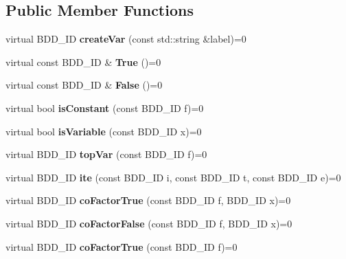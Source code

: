\subsection*{Public Member Functions}
\begin{DoxyCompactItemize}
\item 
virtual B\+D\+D\+\_\+\+ID {\bfseries create\+Var} (const std\+::string \&label)=0\label{classClassProject_1_1ManagerInterface_ab101acd3fbe6a5e29973d88f9862b8b4}

\item 
virtual const B\+D\+D\+\_\+\+ID \& {\bfseries True} ()=0\label{classClassProject_1_1ManagerInterface_a104d0e8bcbd81eb501b66db6e24d1f63}

\item 
virtual const B\+D\+D\+\_\+\+ID \& {\bfseries False} ()=0\label{classClassProject_1_1ManagerInterface_a98d18e1bc840fd664af015facfdcf690}

\item 
virtual bool {\bfseries is\+Constant} (const B\+D\+D\+\_\+\+ID f)=0\label{classClassProject_1_1ManagerInterface_a0edd879f6ecae7bc5f84a2d55373d977}

\item 
virtual bool {\bfseries is\+Variable} (const B\+D\+D\+\_\+\+ID x)=0\label{classClassProject_1_1ManagerInterface_a6eaaec7cbf8826198e490313ccb8f22a}

\item 
virtual B\+D\+D\+\_\+\+ID {\bfseries top\+Var} (const B\+D\+D\+\_\+\+ID f)=0\label{classClassProject_1_1ManagerInterface_ae2c645f859bcc7be3376d478f01eb045}

\item 
virtual B\+D\+D\+\_\+\+ID {\bfseries ite} (const B\+D\+D\+\_\+\+ID i, const B\+D\+D\+\_\+\+ID t, const B\+D\+D\+\_\+\+ID e)=0\label{classClassProject_1_1ManagerInterface_a6ea8f9482d86afb4128c52328d9ec11c}

\item 
virtual B\+D\+D\+\_\+\+ID {\bfseries co\+Factor\+True} (const B\+D\+D\+\_\+\+ID f, B\+D\+D\+\_\+\+ID x)=0\label{classClassProject_1_1ManagerInterface_aab8496a0e551abdad99160e152199f4b}

\item 
virtual B\+D\+D\+\_\+\+ID {\bfseries co\+Factor\+False} (const B\+D\+D\+\_\+\+ID f, B\+D\+D\+\_\+\+ID x)=0\label{classClassProject_1_1ManagerInterface_ad749ef1542c5b23bbbce628d6f666fe4}

\item 
virtual B\+D\+D\+\_\+\+ID {\bfseries co\+Factor\+True} (const B\+D\+D\+\_\+\+ID f)=0\label{classClassProject_1_1ManagerInterface_a4a1880d2245af9130646232551940949}


\end{DoxyCompactItemize}
